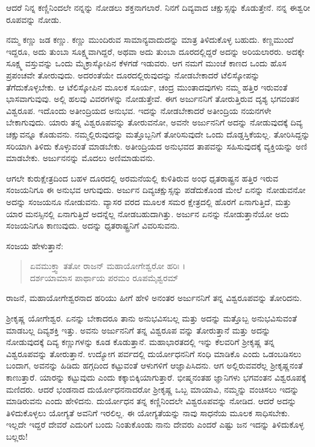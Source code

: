 {\small ಆದರೆ ನಿನ್ನ ಕಣ್ಣಿನಿಂದಲೇ ನನ್ನನ್ನು ನೋಡಲು ಶಕ್ತನಾಗಲಾರೆ. ನಿನಗೆ ದಿವ್ಯವಾದ ಚಕ್ಷುಸ್ಸನ್ನು ಕೊಡುತ್ತೇನೆ. ನನ್ನ ಈಶ್ವರೀ ರೂಪವನ್ನು ನೋಡು.}

ನಮ್ಮ ಕಣ್ಣು ಜಡ ಕಣ್ಣು. ಕಣ್ಣು ಮುಂದಿರುವ ಸಾಮಾನ್ಯವಾದುದನ್ನು ಮಾತ್ರ ತಿಳಿದುಕೊಳ್ಳ ಬಹುದು. ಕಣ್ಣಮುಂದೆ ಇದ್ದರೂ, ಅದು ತುಂಬಾ ಸೂಕ್ಷ್ಮವಾಗಿದ್ದರೆ, ಅಥವಾ ಅದು ತುಂಬಾ ದೂರದಲ್ಲಿದ್ದರೆ ಅದನ್ನು ಅರಿಯಲಾರರು. ಅದಕ್ಕೇ ಸೂಕ್ಷ್ಮ ವಸ್ತುವನ್ನು ಒಂದು ಮೈಕ್ರಾಸ್ಕೋಪಿನ ಕೆಳಗಡೆ ಇಡುವರು. ಆಗ ನಮಗೆ ಮುಂಚೆ ಕಾಣದ ಒಂದು ಹೊಸ ಪ್ರಪಂಚವೇ ತೋರುವುದು. ಅದರಂತೆಯೇ ದೂರದಲ್ಲಿರುವುದನ್ನು ನೋಡಬೇಕಾದರೆ ಟೆಲಿಸ್ಕೋಪನ್ನು ತೆಗೆದುಕೊಳ್ಳಬೇಕು. ಆ ಟೆಲಿಸ್ಕೋಪಿನ ಮೂಲಕ ಸೂರ್ಯ, ಚಂದ್ರ ಮುಂತಾದವುಗಳು ನಮ್ಮ ಹತ್ತಿರ ಇರುವಂತೆ ಭಾಸವಾಗುವುವು. ಅಲ್ಲಿ ಹಲವು ವಿವರಗಳನ್ನು ನೋಡುತ್ತೇವೆ. ಈಗ ಅರ್ಜುನನಿಗೆ ತೋರುತ್ತಿರುವ ದೃಶ್ಯ ಭಗವಂತನ ವಿಶ್ವರೂಪ. ಇದೊಂದು ಅತೀಂದ್ರಿಯದ ಅನುಭವ. ಇದನ್ನು ನೋಡಬೇಕಾದರೆ ಅತೀಂದ್ರಿಯ ನಯನಗಳೇ ಬೇಕಾಗುವುದು. ಯಾರು ತನ್ನ ವಿಶ್ವರೂಪವನ್ನು ತೋರುವನೋ, ಅವನೇ ಅರ್ಜುನನಿಗೆ ಅದನ್ನು ನೋಡುವುದಕ್ಕೆ ದಿವ್ಯ ಚಕ್ಷುವನ್ನೂ ಕೊಡುವನು. ನಮ್ಮಲ್ಲಿರುವುದನ್ನು ಮತ್ತೊಬ್ಬನಿಗೆ ತೋರಿಸುವುದೇ ಒಂದು ದೊಡ್ಡಸ್ತಿಕೆಯಲ್ಲ. ತೋರಿಸಿದ್ದನ್ನು ಸರಿಯಾಗಿ ತಿಳಿದು ಕೊಳ್ಳುವಂತೆ ಮಾಡಬೇಕು. ಅತೀಂದ್ರಿಯದ ಅನುಭವದ ತಾಪವನ್ನು ಸಹಿಸುವುದಕ್ಕೆ ವ್ಯಕ್ತಿಯನ್ನು ಅಣಿ ಮಾಡಬೇಕು. ಅರ್ಜುನನನ್ನು ಮೊದಲು ಅಣಿಮಾಡುವನು.

ಆಗಲೇ ಕುರುಕ್ಷೇತ್ರದಿಂದ ಬಹಳ ದೂರದಲ್ಲಿ ಅರಮನೆಯಲ್ಲಿ ಕುಳಿತಿರುವ ಅಂಧ ಧೃತರಾಷ್ಟ್ರನ ಹತ್ತಿರ ಇರುವ ಸಂಜಯನಿಗೂ ಈ ಅನುಭವ ಆಗುವುದು. ಅರ್ಜುನ ದಿವ್ಯಚಕ್ಷುಸ್ಸನ್ನು ಪಡೆದುಕೊಂಡ ಮೇಲೆ ಏನನ್ನು ನೋಡುವನೋ ಅದನ್ನು ಸಂಜಯನೂ ನೋಡುವನು. ವ್ಯಾಸರ ವರದ ಮೂಲಕ ಸಮರ ಕ್ಷೇತ್ರದಲ್ಲಿ ಹೊರಗೆ ಏನಾಗುತ್ತಿದೆ, ಮತ್ತು ಯಾರ ಮನಸ್ಸಿನಲ್ಲಿ ಏನಾಗುತ್ತಿದೆ ಅದನ್ನೆಲ್ಲ ನೋಡಬಹುದಾಗಿತ್ತು. ಅರ್ಜುನ ಏನನ್ನು ನೋಡುತ್ತಾನೆಯೋ ಅದು ಸಂಜಯನಿಗೂ ಕಾಣುವುದು. ಅದನ್ನು ಧೃತರಾಷ್ಟ್ರನಿಗೆ ವಿವರಿಸುವನು.

ಸಂಜಯ ಹೇಳುತ್ತಾನೆ:

\begin{verse}
ಏವಮುಕ್ತ್ವಾ ತತೋ ರಾಜನ್ ಮಹಾಯೋಗೇಶ್ವರೋ ಹರಿಃ ।\\ದರ್ಶಯಾಮಾಸ ಪಾರ್ಥಾಯ ಪರಮಂ ರೂಪಮೈಶ್ವರಮ್ 
\end{verse}

{\small ರಾಜನೆ, ಮಹಾಯೋಗೇಶ್ವರನಾದ ಹರಿಯು ಹೀಗೆ ಹೇಳಿ ಅನಂತರ ಅರ್ಜುನನಿಗೆ ತನ್ನ ವಿಶ್ವರೂಪವನ್ನು ತೋರಿದನು.}

ಶ್ರೀಕೃಷ್ಣ ಯೋಗೇಶ್ವರ. ಏನನ್ನು ಬೇಕಾದರೂ ತಾನು ಅನುಭವಿಸಬಲ್ಲ ಮತ್ತು ಅದನ್ನು ಮತ್ತೊಬ್ಬ ಅನುಭವಿಸುವಂತೆ ಮಾಡಬಲ್ಲ ದಿವ್ಯಶಕ್ತಿ ಇತ್ತು. ಅವನು ಅರ್ಜುನನಿಗೆ ತನ್ನ ವಿಶ್ವರೂಪ ವನ್ನು ತೋರುತ್ತಾನೆ ಮತ್ತು ಅದನ್ನು ನೋಡುವುದಕ್ಕೆ ದಿವ್ಯ ಕಣ್ಣುಗಳನ್ನು ಕೂಡ ಕೊಡುತ್ತಾನೆ. ಮಹಾಭಾರತದಲ್ಲಿ ಇನ್ನು ಕೆಲವರಿಗೆ ಶ್ರೀಕೃಷ್ಣ ತನ್ನ ವಿಶ್ವರೂಪವನ್ನು ತೋರುತ್ತಾನೆ. ಉದ್ಯೋಗ ಪರ್ವದಲ್ಲಿ ದುರ್ಯೋಧನನಿಗೆ ಸಂಧಿ ಮಾಡಿಕೊ ಎಂದು ಒಡಂಬಡಿಸಲು ಬಂದಾಗ, ಅವನನ್ನು ಹಿಡಿದು ಹಗ್ಗದಿಂದ ಕಟ್ಟುವಂತೆ ಆಳುಗಳಿಗೆ ಆಜ್ಞಾಪಿಸಿದನು. ಆಗ ಅಲ್ಲಿರುವವರೆಲ್ಲ ಶ್ರೀಕೃಷ್ಣನಂತೆ ಕಾಣುತ್ತಾರೆ. ಯಾರನ್ನು ಕಟ್ಟುವುದು ಎಂದು ಕಕ್ಕಾಬಿಕ್ಕಿಯಾಗುತ್ತಾರೆ. ಭೀಷ್ಮನಂತಹ ಜ್ಞಾನಿಗಳು ಭಗವಂತನ ವಿಶ್ವರೂಪಕ್ಕೆ ಮಣಿದರು. ಆದರೆ ಭಂಡನಾದ ದುರ್ಯೋಧನನಾದರೋ ಶ್ರೀಕೃಷ್ಣ ಒಬ್ಬ ಮಾಯಾವಿ, ನಮ್ಮನ್ನು ವಂಚಿಸಲು ಇದನ್ನು ಮಾಡಿರುವನು ಎಂದು ಹೇಳಿದನು. ದುರ್ಯೋಧನ ತನ್ನ ಕಣ್ಣಿನಿಂದಲೇ ವಿಶ್ವರೂಪವನ್ನು ನೋಡಿದ. ಆದರೆ ಅದನ್ನು ತಿಳಿದುಕೊಳ್ಳಲು ಯೋಗ್ಯತೆ ಅವನಿಗೆ ಇರಲಿಲ್ಲ. ಈ ಯೋಗ್ಯತೆಯನ್ನು ನಾವು ಸಾಧನೆಯ ಮೂಲಕ ಸಾಧಿಸಬೇಕು. ಇಲ್ಲದೇ ಇದ್ದರೆ ದೇವರೆ ಎದುರಿಗೆ ಬಂದು ನಿಂತುಕೊಂಡು ನಾನು ದೇವರು ಎಂದರೆ ಎಷ್ಟು ಜನ ಇದನ್ನು ತಿಳಿದುಕೊಳ್ಳ ಬಲ್ಲರು!

